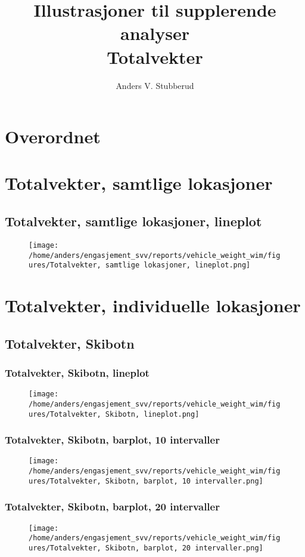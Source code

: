 \documentclass{article}
\begin{document}
\title{Illustrasjoner til supplerende analyser\\Totalvekter}
\author{Anders V. Stubberud}
\maketitle
\tableofcontents
\newpage
\section{Overordnet}

\section{Totalvekter, samtlige lokasjoner}
\subsection{Totalvekter, samtlige lokasjoner, lineplot}
\begin{figure}[H]
\centering
\texttt{[image: /home/anders/engasjement\_svv/reports/vehicle\_weight\_wim/figures/Totalvekter, samtlige lokasjoner, lineplot.png]}
\end{figure}
\section{Totalvekter, individuelle lokasjoner}
\subsection{Totalvekter, Skibotn}
\subsubsection{Totalvekter, Skibotn, lineplot}
\begin{figure}[H]
\centering
\texttt{[image: /home/anders/engasjement\_svv/reports/vehicle\_weight\_wim/figures/Totalvekter, Skibotn, lineplot.png]}
\end{figure}
\subsubsection{Totalvekter, Skibotn, barplot, 10 intervaller}
\begin{figure}[H]
\centering
\texttt{[image: /home/anders/engasjement\_svv/reports/vehicle\_weight\_wim/figures/Totalvekter, Skibotn, barplot, 10 intervaller.png]}
\end{figure}
\subsubsection{Totalvekter, Skibotn, barplot, 20 intervaller}
\begin{figure}[H]
\centering
\texttt{[image: /home/anders/engasjement\_svv/reports/vehicle\_weight\_wim/figures/Totalvekter, Skibotn, barplot, 20 intervaller.png]}
\end{figure}
\end{document}
